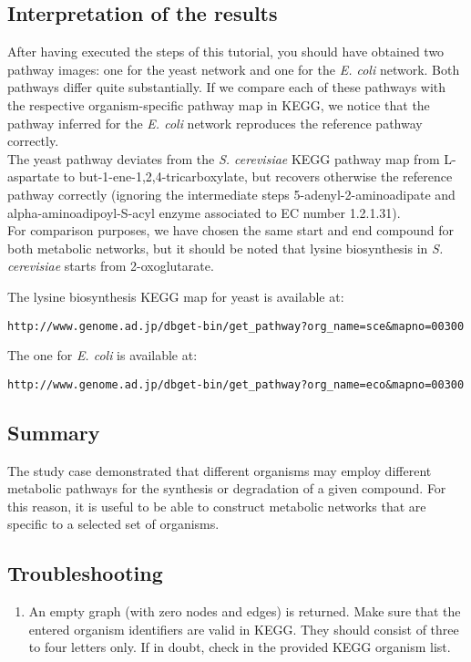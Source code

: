 \subsection{Interpretation of the results}

After having executed the steps of this tutorial, you should have obtained two pathway images:
one for the yeast network and one for the \textit{E. coli} network. Both pathways differ quite substantially.
If we compare each of these pathways with the respective organism-specific pathway map in KEGG, we notice that
the pathway inferred for the \textit{E. coli} network reproduces the reference pathway correctly.\\
The yeast pathway deviates from the \textit{S. cerevisiae} KEGG pathway map from L-aspartate to but-1-ene-1,2,4-tricarboxylate,
but recovers otherwise the reference pathway correctly (ignoring the intermediate steps 5-adenyl-2-aminoadipate and
alpha-aminoadipoyl-S-acyl enzyme associated to EC number 1.2.1.31). \\
For comparison purposes, we have chosen the same start and end compound for both metabolic networks, but it should
be noted that lysine biosynthesis in \textit{S. cerevisiae} starts from 2-oxoglutarate.

The lysine biosynthesis KEGG map for yeast is available at:
\begin{verbatim}
http://www.genome.ad.jp/dbget-bin/get_pathway?org_name=sce&mapno=00300
\end{verbatim}

The one for \textit{E. coli} is available at:
\begin{verbatim}
http://www.genome.ad.jp/dbget-bin/get_pathway?org_name=eco&mapno=00300
\end{verbatim}


\subsection{Summary}

The study case demonstrated that different organisms may employ different metabolic pathways for the synthesis or
degradation of a given compound. For this reason, it is useful to be able to construct metabolic networks that are
specific to a selected set of organisms.

\subsection{Troubleshooting}

\begin{enumerate}

\item An empty graph (with zero nodes and edges) is returned.
Make sure that the entered organism identifiers are valid in KEGG.
They should consist of three to four letters only. If in doubt,
check in the provided KEGG organism list.

\end{enumerate}
